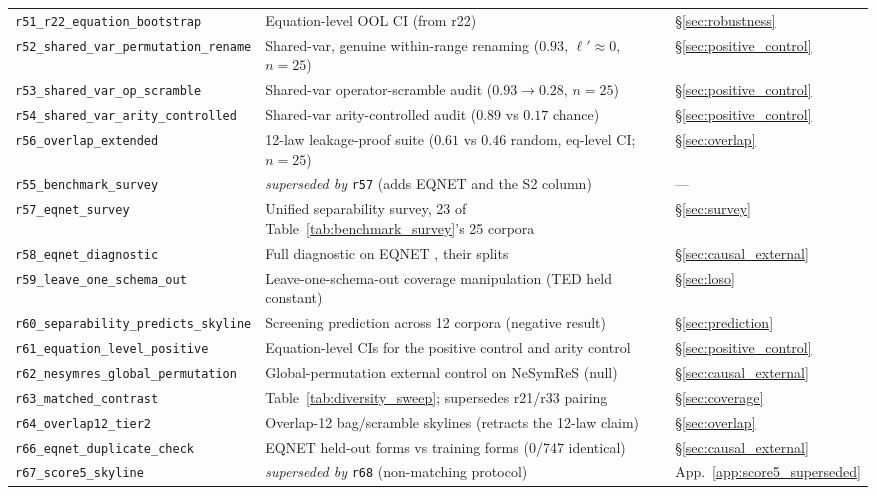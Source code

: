 \begin{center}
\begin{tabular}{@{}p{}p{}p{}@{}}
\texttt{r51\_r22\_equation\_bootstrap} & Equation-level OOL CI (from r22) & \S\ref{sec:robustness} \\
\texttt{r52\_shared\_var\_permutation\_rename} & Shared-var, genuine within-range renaming ($0.93$, $\ell'{\approx}0$, $n{=}25$) & \S\ref{sec:positive_control} \\
\texttt{r53\_shared\_var\_op\_scramble} & Shared-var operator-scramble audit ($0.93{\to}0.28$, $n{=}25$) & \S\ref{sec:positive_control} \\
\texttt{r54\_shared\_var\_arity\_controlled} & Shared-var arity-controlled audit ($0.89$ vs $0.17$ chance) & \S\ref{sec:positive_control} \\
\texttt{r56\_overlap\_extended} & 12-law leakage-proof suite ($0.61$ vs $0.46$ random, eq-level CI; $n{=}25$) & \S\ref{sec:overlap} \\
\texttt{r55\_benchmark\_survey} & \emph{superseded by} \texttt{r57} (adds EQNET and the S2 column) & --- \\
\texttt{r57\_eqnet\_survey} & Unified separability survey, 23 of Table~\ref{tab:benchmark_survey}'s 25 corpora & \S\ref{sec:survey} \\
\texttt{r58\_eqnet\_diagnostic} & Full diagnostic on EQNET \citep{allamanis2017learning}, their splits & \S\ref{sec:causal_external} \\
\texttt{r59\_leave\_one\_schema\_out} & Leave-one-schema-out coverage manipulation (TED held constant) & \S\ref{sec:loso} \\
\texttt{r60\_separability\_predicts\_skyline} & Screening prediction across 12 corpora (negative result) & \S\ref{sec:prediction} \\
\texttt{r61\_equation\_level\_positive} & Equation-level CIs for the positive control and arity control & \S\ref{sec:positive_control} \\
\texttt{r62\_nesymres\_global\_permutation} & Global-permutation external control on NeSymReS (null) & \S\ref{sec:causal_external} \\
\texttt{r63\_matched\_contrast} & Table~\ref{tab:diversity_sweep}; supersedes r21/r33 pairing & \S\ref{sec:coverage} \\
\texttt{r64\_overlap12\_tier2} & Overlap-12 bag/scramble skylines (retracts the 12-law claim) & \S\ref{sec:overlap} \\
\texttt{r66\_eqnet\_duplicate\_check} & EQNET held-out forms vs training forms (0/747 identical) & \S\ref{sec:causal_external} \\
\texttt{r67\_score5\_skyline} & \emph{superseded by} \texttt{r68} (non-matching protocol) & App.~\ref{app:score5_superseded} \\

\end{tabular}
\end{center}
